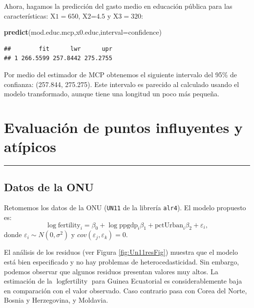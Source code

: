 \documentclass[
]{article}
\newenvironment{Shaded}{\begin{snugshade}}{\end{snugshade}}
\newcommand{\AttributeTok}[1]{\textcolor[rgb]{0.13,0.29,0.53}{#1}}
\newcommand{\FunctionTok}[1]{\textcolor[rgb]{0.13,0.29,0.53}{\textbf{#1}}}
\newcommand{\NormalTok}[1]{#1}
\newcommand{\StringTok}[1]{\textcolor[rgb]{0.31,0.60,0.02}{#1}}
\begin{document}
Ahora, hagamos la predicción del gasto medio en educación pública para las características: \(\mbox{X1}=650\), \(\mbox{X2=4.5}\) y \(\mbox{X3}=320\):

\begin{Shaded}
\begin{Highlighting}[]
\FunctionTok{predict}\NormalTok{(mod.educ.mcp,x0.educ,}\AttributeTok{interval=}\StringTok{\textquotesingle{}confidence\textquotesingle{}}\NormalTok{)}
\end{Highlighting}
\end{Shaded}

\begin{verbatim}
##        fit      lwr      upr
## 1 266.5599 257.8442 275.2755
\end{verbatim}

Por medio del estimador de MCP obtenemos el siguiente intervalo del 95\% de confianza: (257.844, 275.275). Este intervalo es parecido al calculado usando el modelo transformado, aunque tiene una longitud un poco más pequeña.

\hypertarget{evaluaciuxf3n-de-puntos-influyentes-y-atuxedpicos}{%
\section{Evaluación de puntos influyentes y atípicos}\label{evaluaciuxf3n-de-puntos-influyentes-y-atuxedpicos}}

\rule{\textwidth}{0.4pt}

\hypertarget{datos-de-la-onu}{%
\subsection{Datos de la ONU}\label{datos-de-la-onu}}

Retomemos los datos de la ONU (\texttt{UN11} de la librería \texttt{alr4}). El modelo propuesto es:
\begin{equation}
\log \mbox{fertility}_{i} = \beta_{0} + \log \mbox{ppgdp}_{i}\beta_{1} + \mbox{pctUrban}_{i}\beta_{2} + \varepsilon_{i},
\label{eq:modUN}
\end{equation}
donde \(\varepsilon_{i}\sim N(0,\sigma^{2})\) y \(cov(\varepsilon_{j},\varepsilon_{k})=0\).

El análisis de los residuos (ver Figura \ref{fig:Un11resFig}) muestra que el modelo está bien especificado y no hay problemas de heterocedasticidad. Sin embargo, podemos observar que algunos residuos presentan valores muy altos. La estimación de la \(\log \mbox{fertility}\) para Guinea Ecuatorial es considerablemente baja en comparación con el valor observado. Caso contrario pasa con Corea del Norte, Bosnia y Herzegovina, y Moldavia.
\end{document}
